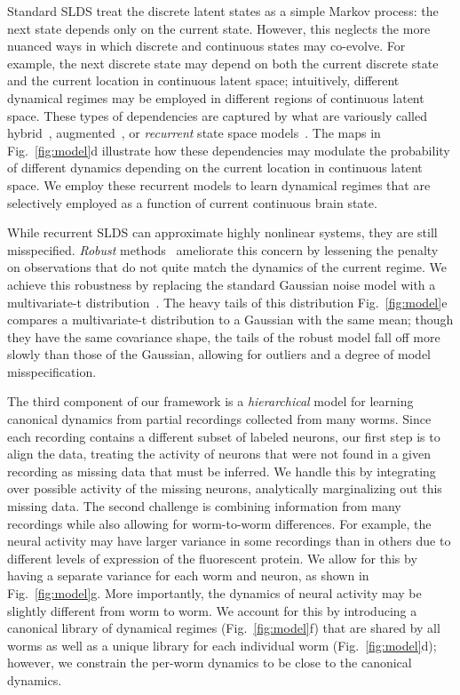 \documentclass[11pt]{article}
\begin{document}
Standard SLDS treat the discrete latent states as a simple Markov
process: the next state depends only on the current state. However,
this neglects the more nuanced ways in which discrete and continuous
states may co-evolve. For example, the next discrete state may depend
on both the current discrete state and the current location in
continuous latent space; intuitively, different dynamical regimes may
be employed in different regions of continuous latent space. These
types of dependencies are captured by what are variously called
hybrid~\citep{paoletti2007identification},
augmented~\citep{barber2006expectation}, or \emph{recurrent} state
space models~\citep{linderman2017recurrent}. The maps in
Fig.~\ref{fig:model}d illustrate how these dependencies may modulate
the probability of different dynamics depending on the current
location in continuous latent space. We employ these recurrent models
to learn dynamical regimes that are selectively employed as a
function of current continuous brain state.

While recurrent SLDS can approximate highly nonlinear systems, they
are still misspecified. \emph{Robust} methods~\citep{huber1981robust}
ameliorate this concern by lessening the penalty on observations that
do not quite match the dynamics of the current regime.  We achieve
this robustness by replacing the standard Gaussian noise model with a
multivariate-t distribution~\citep{lange1989robust}.  The heavy tails
of this distribution Fig.~\ref{fig:model}e compares a multivariate-t
distribution to a Gaussian with the same mean; though they have
the same covariance shape, the tails of the robust model fall off
more slowly than those of the Gaussian, allowing for outliers and a
degree of model misspecification. 

The third component of our framework is a \emph{hierarchical} model
for learning canonical dynamics from partial recordings collected from
many worms.  Since each recording contains a different subset of
labeled neurons, our first step is to align the data, treating the
activity of neurons that were not found in a given recording as
missing data that must be inferred.  We handle this by integrating
over possible activity of the missing neurons, analytically
marginalizing out this missing data.  The second challenge is
combining information from many recordings while also allowing for
worm-to-worm differences.  For example, the neural activity may have
larger variance in some recordings than in others due to different
levels of expression of the fluorescent protein.  We allow for this by
having a separate variance for each worm and neuron, as shown in
Fig.~\ref{fig:model}g.  More importantly, the dynamics of neural
activity may be slightly different from worm to worm.  We account for
this by introducing a canonical library of dynamical regimes
(Fig.~\ref{fig:model}f) that are shared by all worms as well as a
unique library for each individual worm (Fig.~\ref{fig:model}d);
however, we constrain the per-worm dynamics to be close to the
canonical dynamics.
\end{document}
